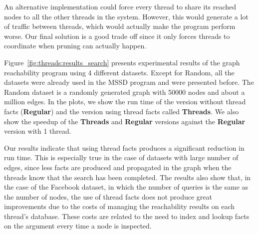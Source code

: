 An alternative implementation could force every thread to share its reached
nodes to all the other threads in the system. However, this would generate a lot
of traffic between threads, which would actually make the program perform worse.
Our final solution is a good trade off since it only forces threads to
coordinate when pruning can actually happen.

Figure~\ref{fig:threads:results_search} presents experimental results of the
graph reachability program using 4 different datasets. Except for Random, all
the datasets were already used in the MSSD program and were presented before.
The Random dataset is a randomly generated graph with 50000 nodes and about a
million edges.  In the plots, we show the run time of the version without thread
facts (\textbf{Regular}) and the version using thread facts called
\textbf{Threads}. We also show the speedup of the \textbf{Threads} and
\textbf{Regular} versions against the \textbf{Regular} version with 1 thread.

Our results indicate that using thread facts produces a significant reduction in
run time. This is especially true in the case of datasets with large number of
edges, since less facts are produced and propagated in the graph when the
threads know that the search has been completed. The results also show that, in
the case of the Facebook dataset, in which the number of queries is the same as
the number of nodes, the use of thread facts does not produce great improvements
due to the costs of managing the reachability results on each thread's database.
These costs are related to the need to index and lookup 
facts on the  argument every time a node is inspected.


